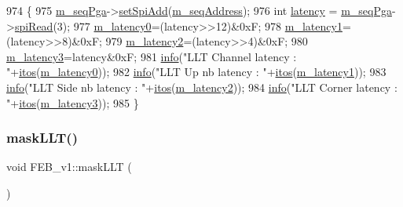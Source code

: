 \begin{DoxyCode}
974                        \{
975   \hyperlink{classFEB__v1_a6c7804ac86796f233a8393043adf2e77}{m\_seqPga}->\hyperlink{classSeqPGA_ac998ce3a6d9b5f2e88cc8393f8c1df53}{setSpiAdd}(\hyperlink{classFEB__v1_a1c1eb093fd1733b9510fcf8bc5c7ad08}{m\_seqAddress});
976   \textcolor{keywordtype}{int} \hyperlink{classFEB__v1_a68050d232efd8d6568910b09a2c18f62}{latency} = \hyperlink{classFEB__v1_a6c7804ac86796f233a8393043adf2e77}{m\_seqPga}->\hyperlink{classSeqPGA_ab3d0e5e5d4014bc7a92588a76b8713d4}{spiRead}(3);
977   \hyperlink{classFEB__v1_a23a3d8bfbf96490890140f13b08a02c1}{m\_latency0}=(latency>>12)&0xF;
978   \hyperlink{classFEB__v1_a026d2f4973bf3ddbc404e35264fdef1f}{m\_latency1}=(latency>>8)&0xF;
979   \hyperlink{classFEB__v1_a2c4b18efd76de3bf7089bba57fb6744f}{m\_latency2}=(latency>>4)&0xF;
980   \hyperlink{classFEB__v1_a2f71bdcef05c845177a62610da490bf9}{m\_latency3}=latency&0xF;
981   \hyperlink{classObject_a644fd329ea4cb85f54fa6846484b84a8}{info}(\textcolor{stringliteral}{"LLT Channel latency : "}+\hyperlink{Tools_8h_af330027dbdafb9a30768b3613c553e60}{itos}(\hyperlink{classFEB__v1_a23a3d8bfbf96490890140f13b08a02c1}{m\_latency0}));
982   \hyperlink{classObject_a644fd329ea4cb85f54fa6846484b84a8}{info}(\textcolor{stringliteral}{"LLT Up nb   latency : "}+\hyperlink{Tools_8h_af330027dbdafb9a30768b3613c553e60}{itos}(\hyperlink{classFEB__v1_a026d2f4973bf3ddbc404e35264fdef1f}{m\_latency1}));
983   \hyperlink{classObject_a644fd329ea4cb85f54fa6846484b84a8}{info}(\textcolor{stringliteral}{"LLT Side nb latency : "}+\hyperlink{Tools_8h_af330027dbdafb9a30768b3613c553e60}{itos}(\hyperlink{classFEB__v1_a2c4b18efd76de3bf7089bba57fb6744f}{m\_latency2}));
984   \hyperlink{classObject_a644fd329ea4cb85f54fa6846484b84a8}{info}(\textcolor{stringliteral}{"LLT Corner  latency : "}+\hyperlink{Tools_8h_af330027dbdafb9a30768b3613c553e60}{itos}(\hyperlink{classFEB__v1_a2f71bdcef05c845177a62610da490bf9}{m\_latency3}));
985 \}
\end{DoxyCode}
\mbox{\label{classFEB__v1_a14807bfa77f92bb82428c39abea5df88}} 
\subsubsection{\texorpdfstring{mask\+L\+L\+T()}{maskLLT()}}
{\footnotesize\ttfamily void F\+E\+B\+\_\+v1\+::mask\+L\+LT (\begin{DoxyParamCaption}{ }\end{DoxyParamCaption})}



